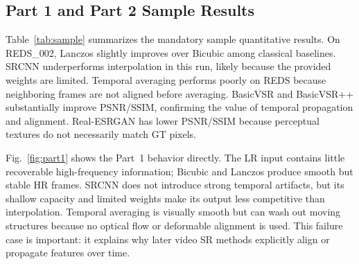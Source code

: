 \subsection{Part 1 and Part 2 Sample Results}
Table~\ref{tab:sample} summarizes the mandatory sample quantitative results. On REDS\_002, Lanczos slightly improves over Bicubic among classical baselines. SRCNN underperforms interpolation in this run, likely because the provided weights are limited. Temporal averaging performs poorly on REDS because neighboring frames are not aligned before averaging. BasicVSR and BasicVSR++ substantially improve PSNR/SSIM, confirming the value of temporal propagation and alignment. Real-ESRGAN has lower PSNR/SSIM because perceptual textures do not necessarily match GT pixels.

Fig.~\ref{fig:part1} shows the Part~1 behavior directly. The LR input contains little recoverable high-frequency information; Bicubic and Lanczos produce smooth but stable HR frames. SRCNN does not introduce strong temporal artifacts, but its shallow capacity and limited weights make its output less competitive than interpolation. Temporal averaging is visually smooth but can wash out moving structures because no optical flow or deformable alignment is used. This failure case is important: it explains why later video SR methods explicitly align or propagate features over time.

\begin{table}[!htbp]
\centering
\small
\caption{Sample-dataset PSNR/SSIM results. Higher is better.}
\label{tab:sample}
\end{table}

